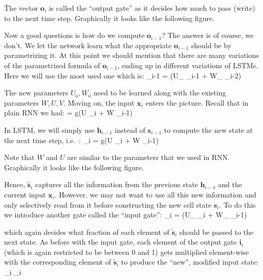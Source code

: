 \v

The vector $\boldsymbol{o}_{i} $ is called the ``output gate'' as it decides how much to pass (write) to the next
time step. Graphically it looks like the following figure.


Now a good questions is how do we compute $\boldsymbol{o}_{i-1}$? The answer is of course, we don't. We let the
network learn what the appropriate $\boldsymbol{o}_{i-1}$ should be by parametrizing it. At this point we should
mention that there are many variations of the parametrized formula of $\boldsymbol{o}_{i-1}$, ending up in different
variations of LSTMs. Here we will use the most used one which is:
\bse
{}_{i-1} = \sigma(U_{} _{i-1} + W_{} _{i-2})
\ese

The new parameters $U_{\text{o}}, W_{\text{o}}$ need to be learned along with the existing parameters $W, U, V$. \v

Moving on, the input $\boldsymbol{x}_{i}$ enters the picture. Recall that in plain RNN we had:
\bse
{} = g(U _i + W _{i-1})
\ese

In LSTM, we will simply use $\boldsymbol{h}_{i-1}$ instead of $\boldsymbol{s}_{i-1}$ to compute the new state at the
next time step, i.e.\ :
\bse
{}_i = g(U _i + W _{i-1})
\ese

Note that $W$ and $U$ are similar to the parameters that we used in RNN. Graphically it looks like the following figure.


Hence, $\boldsymbol{\tilde{s}}_i$ captures all the information from the previous state $\boldsymbol{h}_{i-1}$ and the
current input $\boldsymbol{x}_i $. However, we may not want to use all this new information and only selectively read
from it before constructing the new cell state $\boldsymbol{s}_i$. To do this we introduce another gate called the
``input gate'':
\bse
{}_{i} = \sigma(U_{} _{i} + W_{} _{i-1})
\ese

which again decides what fraction of each element of $\boldsymbol{\tilde{s}}_i$ should be passed to the next state.
As before with the input gate, each element of the output gate $\boldsymbol{i}_{i} $ (which is again restricted to be
between 0 and 1) gets multiplied element-wise with the corresponding element of $\boldsymbol{\tilde{s}}_i$ to produce
the ``new'', modified input state:
\bse
{}_i \odot {}_{i}
\ese

